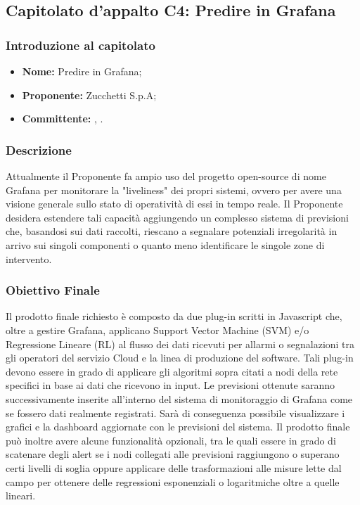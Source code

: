 \subsection{Capitolato d'appalto C4: Predire in Grafana}
	\subsubsection{Introduzione al capitolato}
	\begin{itemize}
		\item \textbf{Nome:} Predire in Grafana;
		\item \textbf{Proponente}\textbf{:} Zucchetti S.p.A;
		\item \textbf{Committente}\textbf{:} \TV, \RC.
	\end{itemize}
	
	\subsubsection{Descrizione}
	Attualmente il Proponente fa ampio uso del progetto open-source di 	nome Grafana per monitorare la "liveliness" dei propri sistemi, ovvero per avere una visione generale sullo stato di operatività di essi in tempo reale. Il Proponente desidera estendere tali capacità aggiungendo un complesso sistema di previsioni che, basandosi sui dati raccolti, riescano a segnalare potenziali irregolarità in arrivo sui singoli componenti o quanto meno identificare le singole zone di intervento.
	
	\subsubsection{Obiettivo Finale}
	Il prodotto finale richiesto è composto da due plug-in scritti in Javascript che, oltre a gestire Grafana, applicano Support Vector Machine (SVM) e/o Regressione Lineare (RL) al flusso dei dati ricevuti per allarmi o segnalazioni tra gli operatori del servizio Cloud e la linea di produzione del software. Tali plug-in devono essere in grado di applicare gli algoritmi sopra citati a nodi della rete specifici in base ai dati che ricevono in input. Le previsioni ottenute saranno successivamente inserite all'interno del sistema di monitoraggio di Grafana come se fossero dati realmente registrati. Sarà di conseguenza possibile visualizzare i grafici e la dashboard aggiornate con le previsioni del sistema. Il prodotto finale può inoltre avere alcune funzionalità opzionali, tra le quali essere in grado di scatenare degli alert se i nodi collegati alle previsioni raggiungono o superano certi livelli di soglia oppure applicare delle trasformazioni alle misure lette dal campo per ottenere delle regressioni esponenziali o logaritmiche oltre a quelle lineari.
	
